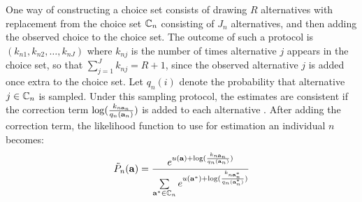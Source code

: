 One way of constructing a choice set consists of drawing $R$ alternatives with replacement from the choice set $\mathbb{C}_n$ consisting of $J_n$ alternatives, and then adding the observed choice to the choice set. The outcome of such a protocol is $({k}_{n1},{k}_{n2},\dots,{k}_{nJ})$ where ${k}_{nj}$ is the number of times alternative $j$ appears in the choice set, so that $\sum_{j=1}^J {k}_{nj} = R+1$, since the observed alternative $j$ is added once extra to the choice set. Let $q_n(i)$ denote the probability that alternative $j \in \mathbb{C}_n$ is sampled. Under this sampling protocol, the estimates are consistent if the correction term $\log(\frac{k_{n{\bf a}_n}}{q_n({\bf a}_n)})$ is added to each alternative \citep{frejinger09}. After adding the correction term, the likelihood function to use for estimation an individual $n$ becomes:
\begin{equation} \label{eq:cond_like_corr}
\tilde{P}_n(\ve{a}) = \frac{e^{u(\ve{a}) + \log(\frac{k_{n\ve{a}_n}}{q_n(\ve{a}_n)})}}{\sum\limits_{\ve{a}^* \in \Cc_n} e^{u(\ve{a}^*) + \log(\frac{k_{n\ve{a}^*_n}}{q_n(\ve{a}^*_n)})}}
\end{equation}
%
%
%
